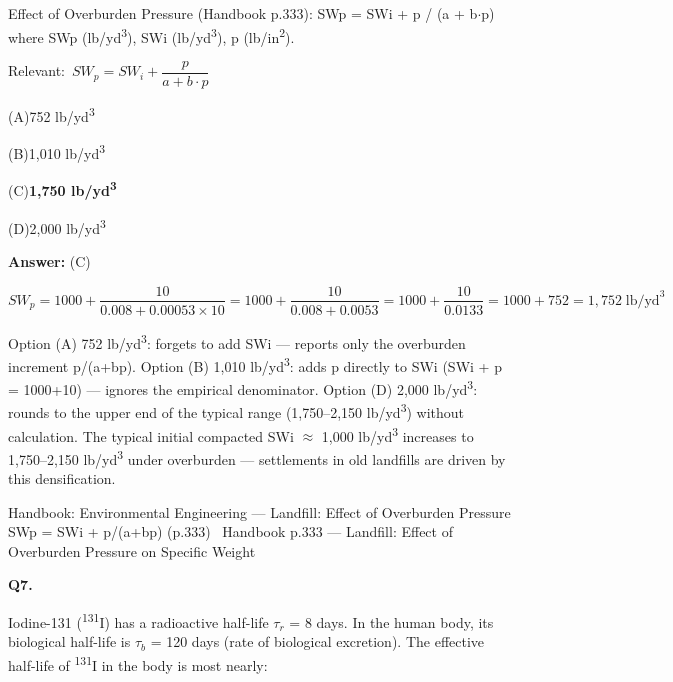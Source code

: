 \documentclass[11pt]{article}
\newcommand{\correct}[1]{\textbf{#1}\;{\color{accent}$\checkmark$}}
\newcommand{\optline}[2]{\par\noindent\hspace{1.2em}(#1)\hspace{0.6em}#2}
\begin{document}
Effect of Overburden Pressure (Handbook p.333):
SWp = SWi + p / (a + b$\cdot$p)
where SWp (lb/yd\textsuperscript{3}), SWi (lb/yd\textsuperscript{3}), p (lb/in\textsuperscript{2}).\par\vspace{3pt}
{\small\color{soft}Relevant:}\ $SW_p = SW_i + \dfrac{p}{a + b \cdot p}$\par\vspace{3pt}
\optline{A}{752 lb/yd\textsuperscript{3}}
\optline{B}{1,010 lb/yd\textsuperscript{3}}
\optline{C}{\correct{1,750 lb/yd\textsuperscript{3}}}
\optline{D}{2,000 lb/yd\textsuperscript{3}}
\par\vspace{3pt}
\vspace{2pt}\par\noindent\colorbox{boxbg}{\parbox{\dimexpr\linewidth-2\fboxsep\relax}{%
\vspace{2pt}\textbf{Answer:} (C)\par\vspace{2pt}
{\small \[SW_p = 1000 + \frac{10}{0.008 + 0.00053 \times 10} = 1000 + \frac{10}{0.008 + 0.0053} = 1000 + \frac{10}{0.0133} = 1000 + 752 = 1{,}752\;\text{lb/yd}^3\]

Option (A) 752 lb/yd\textsuperscript{3}: forgets to add SWi --- reports only the overburden increment p/(a+bp). Option (B) 1,010 lb/yd\textsuperscript{3}: adds p directly to SWi (SWi + p = 1000+10) --- ignores the empirical denominator. Option (D) 2,000 lb/yd\textsuperscript{3}: rounds to the upper end of the typical range (1,750--2,150 lb/yd\textsuperscript{3}) without calculation. The typical initial compacted SWi $\approx$ 1,000 lb/yd\textsuperscript{3} increases to 1,750--2,150 lb/yd\textsuperscript{3} under overburden --- settlements in old landfills are driven by this densification.}\par\vspace{2pt}
{\footnotesize\color{soft}Handbook: Environmental Engineering --- Landfill: Effect of Overburden Pressure SWp = SWi + p/(a+bp) (p.333) \textbullet\ Handbook p.333 --- Landfill: Effect of Overburden Pressure on Specific Weight}\vspace{2pt}
}}
\vspace{9pt}
\filbreak
\textbf{\color{accent}Q7.}\par\vspace{2pt}
Iodine-131 (\textsuperscript{1}\textsuperscript{3}\textsuperscript{1}I) has a radioactive half-life $\tau_r$ = 8 days. In the human body, its biological half-life is $\tau_b$ = 120 days (rate of biological excretion). The effective half-life of \textsuperscript{1}\textsuperscript{3}\textsuperscript{1}I in the body is most nearly:
\end{document}
